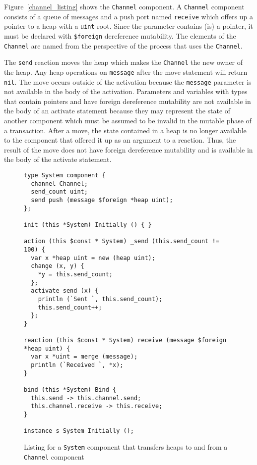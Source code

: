 Figure~\ref{channel_listing} shows the \verb+Channel+ component.
A \verb+Channel+ component consists of a queue of messages and a push port named \verb+receive+ which offers up a pointer to a heap with a \verb+uint+ root.
Since the parameter contains (is) a pointer, it must be declared with \verb+$foreign+ dereference mutability.
The elements of the \verb+Channel+ are named from the perspective of the process that uses the \verb+Channel+.

The \verb+send+ reaction moves the heap which makes the \verb+Channel+ the new owner of the heap.
Any heap operations on \verb+message+ after the move statement will return \verb+nil+.
The move occurs outside of the activation because the \verb+message+ parameter is not available in the body of the activation.
Parameters and variables with types that contain pointers and have foreign dereference mutability are not available in the body of an activate statement because they may represent the state of another component which must be assumed to be invalid in the mutable phase of a transaction.
After a move, the state contained in a heap is no longer available to the component that offered it up as an argument to a reaction.
Thus, the result of the move does not have foreign dereference mutability and is available in the body of the activate statement.

\begin{figure}
\begin{verbatim}
type System component {
  channel Channel;
  send_count uint;
  send push (message $foreign *heap uint);
};

init (this *System) Initially () { }

action (this $const * System) _send (this.send_count != 100) {
  var x *heap uint = new (heap uint);
  change (x, y) {
    *y = this.send_count;
  };
  activate send (x) {
    println (`Sent `, this.send_count);
    this.send_count++;
  };
}

reaction (this $const * System) receive (message $foreign *heap uint) {
  var x *uint = merge (message);
  println (`Received `, *x);
}

bind (this *System) Bind {
  this.send -> this.channel.send;
  this.channel.receive -> this.receive;
}

instance s System Initially ();
\end{verbatim}
\cprotect\caption{Listing for a \verb+System+ component that transfers heaps to and from a \verb+Channel+ component}
\label{channel_system_listing}
\end{figure}


